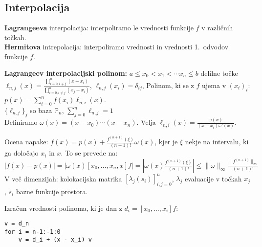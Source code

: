 \documentclass[a4paper,12pt]{article}
\theoremstyle{definition}
\def\P{\mathbb{P}}
\begin{document}
\subsection*{Interpolacija}
\textbf{Lagrangeeva} interpolacija: interpoliramo le vrednosti funkcije $f$ v različnih točkah.\\
\textbf{Hermitova} intrepolacija: interpoliramo vrednosti in vrednosti 1.\ odvodov funkcije $f$.

\textbf{Lagrangeev interpolacijski polinom:} $a \leq x_0 < x_1 < \cdots x_n \leq b$ delilne točke\\
$\displaystyle \ell_{n,j}(x)=\frac{\prod_{i=0,i\neq j}^n(x-x_i)}{\prod_{i=0,i\neq
j}^n(x_j-x_i)}$, $\ell_{n,j}(x_i) = \delta_{ij}$, Polinom, ki se z $f$ ujema v
$(x_i)_i$: $p(x) = \sum_{i=0}^nf(x_i)\ell_{n,i}(x)$.\\
$\{\ell_{n,j}\}_j$ so baza $\P_n$, $\sum_{j=0}^n \ell_{n,j} = 1$\\
Definiramo $\omega(x) = (x-x_0)\cdots(x-x_n)$. Velja $\ell_{n,i}(x) = \frac{\omega(x)}{(x-x_i)\omega'(x)}$.

Ocena napake: $f(x) = p(x) + \frac{f^{(n+1)}(\xi)}{(n+1)!}\omega(x)$, kjer je
$\xi$ nekje na intervalu, ki ga določajo $x_i$ in $x$. To se prevede na:
$|f(x) - p(x)|  = |\omega(x) [x_0, \ldots, x_n, x]f| =
|\omega(x) \frac{f^{(n+1)}(\xi)}{(n+1)!}| \leq \|\omega\|_\infty
\frac{\|f^{(n+1)}\|_\infty}{(n+1)!}$\\
V več dimenzijah: kolokacijska matrika $[\lambda_j(s_i)]_{i,j = 0}^n$,
$\lambda_j$ evaluacije v točkah $x_j$, $s_i$ bazne funkcije prostora.

Izračun vrednosti polinoma, ki je dan z $d_i = [x_0, \ldots, x_i]f$:\vspace{-\baselineskip}
\small
\begin{verbatim}
v = d_n
for i = n-1:-1:0
    v = d_i + (x - x_i) v
\end{verbatim}
\normalsize
\end{document}
